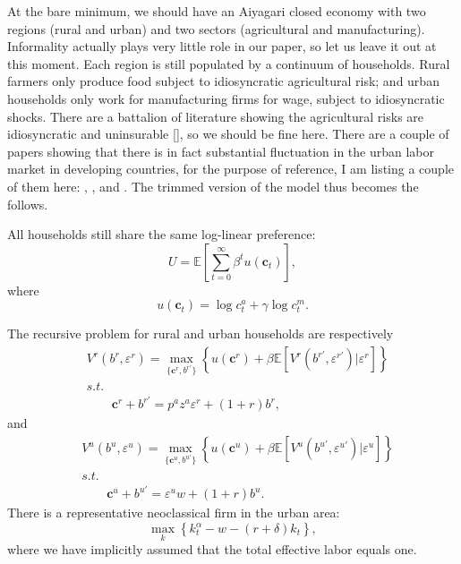 \documentclass[twoside,11pt,leqno]{article}
\newcommand{\E}{\mathbb{E}}
\renewcommand{\vec}[1]{\ensuremath{\mathbf{#1}}}
\begin{document}
At the bare minimum, we should have an Aiyagari closed economy with two regions (rural and urban) and two sectors (agricultural and manufacturing). Informality actually plays very little role in our paper, so let us leave it out at this moment. Each region is still populated by a continuum of households. Rural farmers only produce food subject to idiosyncratic agricultural risk; and urban households only work for manufacturing firms for wage, subject to idiosyncratic shocks. There are a battalion of literature showing the agricultural risks are idiosyncratic and uninsurable [\citet{DerconChristiaensen:2011}], so we should be fine here. There are a couple of papers showing that there is in fact substantial fluctuation in the urban labor market in developing countries, for the purpose of reference, I am listing a couple of them here: \citet{BlattmanDercon:2018}, \citet{Fengetal:2018}, \citet{Franklin:2018} and \citet{Poschke:2018}. The trimmed version of the model thus becomes the follows.

All households still share the same log-linear preference:
\begin{equation*}
    U = \E \left[\sum_{t=0}^{\infty} \beta^t u(\vec{c}_t) \right],
\end{equation*}
where
\begin{equation*}
    u(\vec{c}_t) = \log c_t^a + \gamma \log c_t^m.
\end{equation*}

The recursive problem for rural and urban households are respectively
\begin{align*}
    & V^r(b^r,\varepsilon^r) = \max_{\{\vec{c}^r,b^{r'}\}} \left\{ u(\vec{c}^r) + \beta \E[V^r(b^{r'},\varepsilon^{r'})|\varepsilon^r] \right\} \\
    & s.t. \\
    & \qquad \vec{c}^r + b^{r'} = p^a z^a \varepsilon^r + (1+r)b^r,
\end{align*}
and
\begin{align*}
    & V^u(b^u,\varepsilon^u) = \max_{\{\vec{c}^u,b^{u'}\}} \left\{ u(\vec{c}^u) + \beta \E[V^u(b^{u'},\varepsilon^{u'})|\varepsilon^u] \right\} \\
    & s.t. \\
    & \qquad \vec{c}^u + b^{u'} = \varepsilon^u w + (1+r)b^u.
\end{align*}
There is a representative neoclassical firm in the urban area:
\begin{equation*}
    \max_{k} \left\{ k_t^{\alpha} - w - (r+\delta)k_t \right\},
\end{equation*}
where we have implicitly assumed that the total effective labor equals one.
\end{document}
